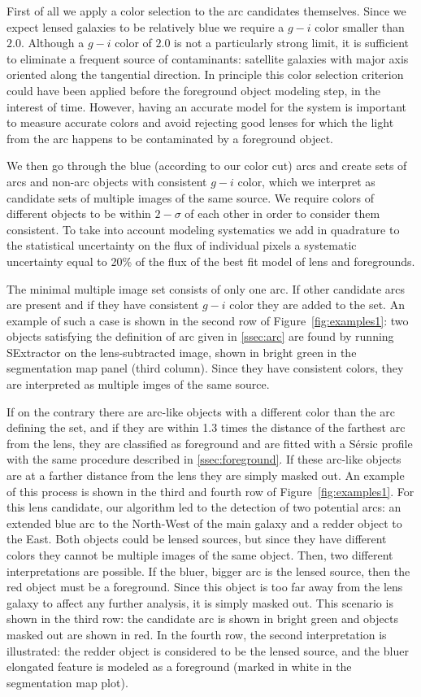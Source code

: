 \documentclass[a4paper,fleqn,usenatbib]{mnras}
\def\Fref#1{Figure~\ref{#1}\xspace}
\begin{document}
First of all we apply a color selection to the arc candidates themselves. Since we expect lensed galaxies to be relatively blue we require a $g-i$ color smaller than $2.0$.
Although a $g-i$ color of $2.0$ is not a particularly strong limit, it is sufficient to eliminate a frequent source of contaminants: satellite galaxies with major axis oriented along the tangential direction.
In principle this color selection criterion could have been applied before the foreground object modeling step, in the interest of time. However, having an accurate model for the system is important to measure accurate colors and avoid rejecting good lenses for which the light from the arc happens to be contaminated by a foreground object.
 
We then go through the blue (according to our color cut) arcs and create sets of arcs and non-arc objects with consistent $g-i$ color, which we interpret as candidate sets of multiple images of the same source. 
We require colors of different objects to be within $2-\sigma$ of each other in order to consider them consistent. To take into account modeling systematics we add in quadrature to the statistical uncertainty on the flux of individual pixels a systematic uncertainty equal to 20\% of the flux of the best fit model of lens and foregrounds.

The minimal multiple image set consists of only one arc. 
If other candidate arcs are present and if they have consistent $g-i$ color they are added to the set. An example of such a case is shown in the second row of \Fref{fig:examples1}: two objects satisfying the definition of arc given in \ref{ssec:arc} are found by running SExtractor on the lens-subtracted image, shown in bright green in the segmentation map panel (third column). Since they have consistent colors, they are interpreted as multiple imges of the same source.

If on the contrary there are arc-like objects with a different color than the arc defining the set, and if they are within 1.3 times the distance of the farthest arc from the lens, they are classified as foreground and are fitted with a S\'{e}rsic profile with the same procedure described in \ref{ssec:foreground}. If these arc-like objects are at a farther distance from the lens they are simply masked out.
An example of this process is shown in the third and fourth row of \Fref{fig:examples1}. For this lens candidate, our algorithm led to the detection of two potential arcs: an extended blue arc to the North-West of the main galaxy and a redder object to the East.
Both objects could be lensed sources, but since they have different colors they cannot be multiple images of the same object. Then, two different interpretations are possible. If the bluer, bigger arc is the lensed source, then the red object must be a foreground. Since this object is too far away from the lens galaxy to affect any further analysis, it is simply masked out. This scenario is shown in the third row: the candidate arc is shown in bright green and objects masked out are shown in red.
In the fourth row, the second interpretation is illustrated: the redder object is considered to be the lensed source, and the bluer elongated feature is modeled as a foreground (marked in white in the segmentation map plot).
\end{document}
